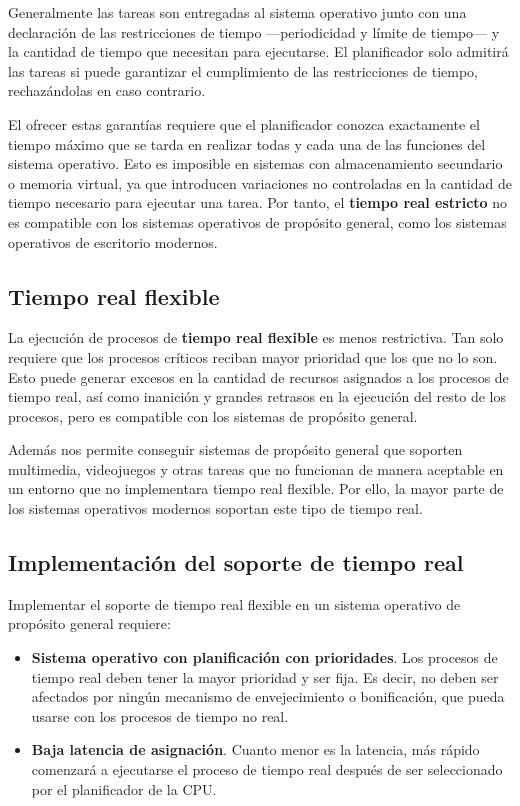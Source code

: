 Generalmente las tareas son entregadas al sistema operativo junto con
una declaración de las restricciones de tiempo ---periodicidad y límite
de tiempo--- y la cantidad de tiempo que necesitan para ejecutarse. El
planificador solo admitirá las tareas si puede garantizar el
cumplimiento de las restricciones de tiempo, rechazándolas en caso
contrario.

El ofrecer estas garantías requiere que el planificador conozca
exactamente el tiempo máximo que se tarda en realizar todas y cada una
de las funciones del sistema operativo. Esto es imposible en sistemas
con almacenamiento secundario o memoria virtual, ya que introducen
variaciones no controladas en la cantidad de tiempo necesario para
ejecutar una tarea. Por tanto, el \textbf{tiempo real estricto} no es
compatible con los sistemas operativos de propósito general, como los
sistemas operativos de escritorio modernos.

\subsection{Tiempo real flexible}\label{_tiempo_real_flexible}

{} {} {} La ejecución de procesos de \textbf{tiempo real flexible} es
menos restrictiva. Tan solo requiere que los procesos críticos reciban
mayor prioridad que los que no lo son. Esto puede generar excesos en la
cantidad de recursos asignados a los procesos de tiempo real, así como
inanición y grandes retrasos en la ejecución del resto de los procesos,
pero es compatible con los sistemas de propósito general.

Además nos permite conseguir sistemas de propósito general que soporten
multimedia, videojuegos y otras tareas que no funcionan de manera
aceptable en un entorno que no implementara tiempo real flexible. Por
ello, la mayor parte de los sistemas operativos modernos soportan este
tipo de tiempo real.

\subsection{Implementación del soporte de tiempo
real}\label{_implementaciuxf3n_del_soporte_de_tiempo_real}

Implementar el soporte de tiempo real flexible en un sistema operativo
de propósito general requiere:

\begin{itemize}
\item
  \textbf{Sistema operativo con planificación con prioridades}. Los
  procesos de tiempo real deben tener la mayor prioridad y ser fija. Es
  decir, no deben ser afectados por ningún mecanismo de envejecimiento o
  bonificación, que pueda usarse con los procesos de tiempo no real.
\item
  \textbf{Baja latencia de asignación}. Cuanto menor es la latencia, más
  rápido comenzará a ejecutarse el proceso de tiempo real después de ser
  seleccionado por el planificador de la CPU.
\end{itemize}

